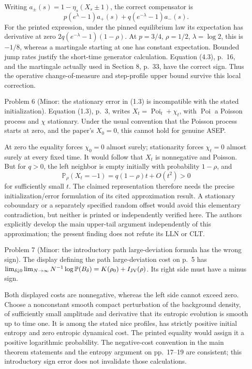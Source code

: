 \documentclass[10pt]{article}
\begin{document}
Writing \(a_\pm(s)=1-\eta_s(X_s\pm1)\), the correct compensator is \[p(e^\lambda-1)a_+(s)+q(e^{-\lambda}-1)a_-(s).\] For the printed expression, under the pinned equilibrium law its expectation has derivative at zero \(2q(e^{-\lambda}-1)(1-\rho)\). At \(p=3/4\), \(\rho=1/2\), \(\lambda=\log2\), this is \(-1/8\), whereas a martingale starting at one has constant expectation. Bounded jump rates justify the short-time generator calculation. Equation (4.3), p. 16, and the martingale actually used in Section 8, p. 33, have the correct sign. Thus the operative change-of-measure and step-profile upper bound survive this local correction.\par
Problem 6 (Minor: the stationary error in (1.3) is incompatible with the stated initialization).  Equation (1.3), p. 3, writes \(X_t=\operatorname{Poi}_t+\chi_t\), with \(\operatorname{Poi}\) a Poisson process and \(\chi\) stationary. Under the usual convention that the Poisson process starts at zero, and the paper’s \(X_0=0\), this cannot hold for genuine ASEP.\par
At zero the equality forces \(\chi_0=0\) almost surely; stationarity forces \(\chi_t=0\) almost surely at every fixed time. It would follow that \(X_t\) is nonnegative and Poisson. But for \(q>0\), the left neighbor is empty initially with probability \(1-\rho\), and \[\mathbb P_\rho(X_t=-1)=q(1-\rho)t+O(t^2)>0\] for sufficiently small \(t\). The claimed representation therefore needs the precise initialization/error formulation of its cited approximation result. A stationary coboundary or a separately specified random offset would avoid this elementary contradiction, but neither is printed or independently verified here. The authors explicitly develop the main upper-tail argument independently of this approximation; the present finding does not refute its LLN or CLT.\par
Problem 7 (Minor: the introductory path large-deviation formula has the wrong sign).  The display defining the path large-deviation cost on p. 5 has \(\lim_{\delta\downarrow0}\lim_{N\to\infty}N^{-1}\log\mathbb P(B_\delta)=K(\rho_0)+I_{\rm JV}(\rho)\). Its right side must have a minus sign.\par
Both displayed costs are nonnegative, whereas the left side cannot exceed zero. Choose a nonconstant smooth compact perturbation of the background density, of sufficiently small amplitude and derivative that its entropic evolution is smooth up to time one. It is among the stated nice profiles, has strictly positive initial entropy and zero entropic dynamical cost. The printed equality would assign it a positive logarithmic probability. The negative-cost convention in the main theorem statements and the entropy argument on pp. 17–19 are consistent; this introductory sign error does not invalidate those calculations.\par
\end{document}
